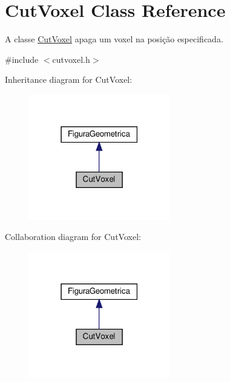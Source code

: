 \hypertarget{class_cut_voxel}{}\section{Cut\+Voxel Class Reference}
\label{class_cut_voxel}


A classe \hyperlink{class_cut_voxel}{Cut\+Voxel} apaga um voxel na posição especificada.  




{\ttfamily \#include $<$cutvoxel.\+h$>$}



Inheritance diagram for Cut\+Voxel\+:
\nopagebreak
\begin{figure}[H]
\begin{center}
\leavevmode
\includegraphics[width=174pt]{class_cut_voxel__inherit__graph}
\end{center}
\end{figure}


Collaboration diagram for Cut\+Voxel\+:
\nopagebreak
\begin{figure}[H]
\begin{center}
\leavevmode
\includegraphics[width=174pt]{class_cut_voxel__coll__graph}
\end{center}
\end{figure}

